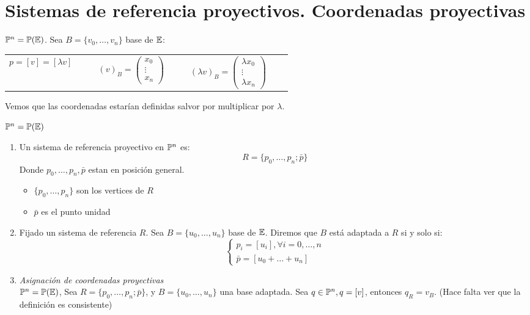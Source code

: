 \section{Sistemas de referencia proyectivos. Coordenadas proyectivas}

\begin{obs}
    $\mathbb{P}^n = \mathbb{P}(\mathbb{E})$. Sea $B = \{v_0, \dots, v_n\}$ base de $\mathbb{E}$:
    \begin{center} \begin{tabular}{ccc}
        $p = [v] = [\lambda v] \qquad $ &
        $(v)_B = \begin{pmatrix} x_0 \\ \vdots \\ x_n \end{pmatrix}\qquad $&
        $(\lambda v)_B = \begin{pmatrix} \lambda x_0 \\ \vdots \\ \lambda x_n \end{pmatrix} \qquad$
    \end{tabular} \end{center}
    Vemos que las coordenadas estarían definidas salvor por multiplicar por $\lambda$.
\end{obs}
\begin{defi}
    $\mathbb{P}^n = \mathbb{P}(\mathbb{E})$
    \begin{enumerate}
        \item Un sistema de referencia proyectivo en $\mathbb{P}^n$ es:
            \[ R= \{ p_0, \dots, p_n; \bar{p} \} \]
            Donde $p_0, \dots, p_n, \bar{p}$ estan en posición general.
            \begin{itemize}
                \item $\{ p_0, \dots, p_n \}$ son los vertices de $R$
                \item $\bar{p}$ es el punto unidad
            \end{itemize}
        \item Fijado un sistema de referencia $R$. Sea $B = \{ u_0, \dots, u_n \}$ base de $\mathbb{E}$. Diremos que $B$ está adaptada a $R$ si y solo si:
            \[ \begin{cases} p_i = [u_i], \forall i = 0, \dots, n \\ \bar{p} = [u_0 + \dots + u_n ] \end{cases} \]
        \item \textit{Asignación de coordenadas proyectivas} \\
            $\mathbb{P}^n = \mathbb{P}(\mathbb{E})$, Sea $R = \{ p_0, \dots, p_n; \bar{p} \}$, y $B = \{u_0, \dots, u_n\}$ una base adaptada. Sea $q \in \mathbb{P}^n, q = [v]$, entonces
            $q_R = v_B$. (Hace falta ver que la definición es consistente)
    \end{enumerate}
\end{defi}

